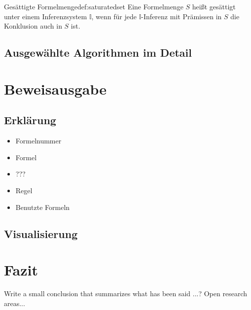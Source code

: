 \documentclass{article}
\begin{document}
\begin{definition}{Gesättigte Formelmenge}{def:saturatedset}
	Eine Formelmenge $S$ heißt gesättigt unter einem Inferenzsystem $\mathds{I}$, wenn für jede $\mathds{I}$-Inferenz mit Prämissen in $S$ die Konklusion auch in $S$ ist.
\end{definition}

\subsection{Ausgewählte Algorithmen im Detail}
\label{subsec:algos}


\section{Beweisausgabe}
\label{sec:output}


\subsection{Erklärung}
\label{subsec:outputexplained}

\begin{itemize}
	\item Formelnummer
	\item Formel
	\item ???
	\item Regel
	\item Benutzte Formeln
	
\end{itemize}

\subsection{Visualisierung}
\label{subsec:outputvis}

\section{Fazit}
\label{sec:conclusion}
Write a small conclusion that summarizes what has been said ...?
Open research areas...





\end{document}
